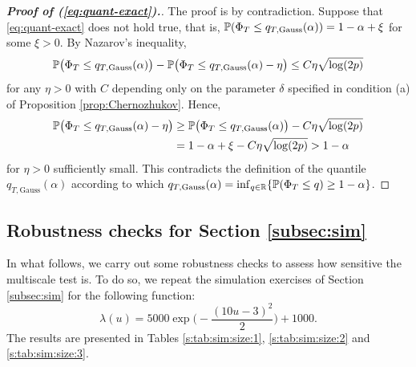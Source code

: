 \documentclass[a4paper,12pt]{article}
\numberwithin{equation}{section}
\begin{document}
\begin{proof}[\textnormal{\textbf{Proof of (\ref{eq:quant-exact}).}}]
The proof is by contradiction. Suppose that \eqref{eq:quant-exact} does not hold true, that is, $\mathbb{P}(\Phi_T \le q_{T,\text{Gauss}}(\alpha)) = 1-\alpha + \xi$ for some $\xi > 0$. By Nazarov's inequality, 
\begin{equation*}
\mathbb{P} \big(\Phi_T \le q_{T,\text{Gauss}}(\alpha)\big) - \mathbb{P}\big(\Phi_T \le q_{T,\text{Gauss}}(\alpha) - \eta\big) \le C \eta \sqrt{\log (2p)} 
\end{equation*}
for any $\eta > 0$ with $C$ depending only on the parameter $\delta$ specified in condition (a) of Proposition \ref{prop:Chernozhukov}. Hence, 
\begin{align*}
\mathbb{P} \big(\Phi_T \le q_{T,\text{Gauss}}(\alpha) - \eta\big) 
 & \ge \mathbb{P}\big(\Phi_T \le q_{T,\text{Gauss}}(\alpha) \big) - C \eta \sqrt{\log(2p)} \\
 & = 1-\alpha + \xi - C \eta \sqrt{\log(2p)} > 1-\alpha
\end{align*}
for $\eta > 0$ sufficiently small. This contradicts the definition of the quantile $q_{T,\text{Gauss}}(\alpha)$ according to which $q_{T,\text{Gauss}}(\alpha) = \inf_{q \in \mathbb{R}} \{ \mathbb{P}(\Phi_T \le q) \ge 1-\alpha \}$. 
\end{proof}

\newpage
\subsection*{Robustness checks for Section \ref{subsec:sim}}\label{s:subsec:robustness}
In what follows, we carry out some robustness checks to assess how sensitive the multiscale test is. To do so, we repeat the simulation exercises of Section \ref{subsec:sim} for the following function:
\[ \lambda(u) = 5000 \exp\Big(-\frac{(10 u-3)^2}{2}\Big) + 1000. \]
The results are presented in Tables \ref{s:tab:sim:size:1},  \ref{s:tab:sim:size:2} and \ref{s:tab:sim:size:3}.
\end{document}

